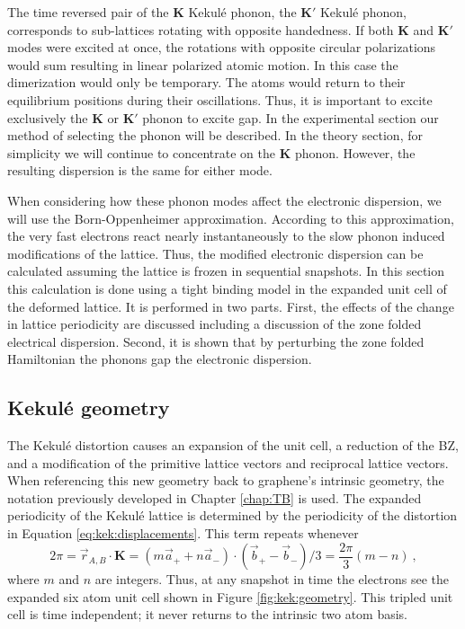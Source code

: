 The time reversed pair of the $\bm{K}$ Kekul\'e phonon, the $\bm{K'}$ Kekul\'e phonon, corresponds to sub-lattices rotating with opposite handedness.
If both $\bm{K}$ and $\bm{K'}$ modes were excited at once, the rotations with opposite circular polarizations would sum resulting in linear polarized atomic motion.
In this case the dimerization would only be temporary.
The atoms would return to their equilibrium positions during their oscillations.
Thus, it is important to excite exclusively the $\bm{K}$ or $\bm{K'}$ phonon to excite gap.
In the experimental section our method of selecting the phonon will be described.
In the theory section, for simplicity we will continue to concentrate on the $\bm{K}$ phonon.
However, the resulting dispersion is the same for either mode. 

When considering how these phonon modes affect the electronic dispersion, we will use the Born-Oppenheimer approximation.
According to this approximation, the very fast electrons react nearly instantaneously to the slow phonon induced modifications of the lattice.
Thus, the modified electronic dispersion can be calculated assuming the lattice is frozen in sequential snapshots.
In this section this calculation is done using a tight binding model in the expanded unit cell of the deformed lattice.
It is performed in two parts.
First, the effects of the change in lattice periodicity are discussed including a discussion of the zone folded electrical dispersion.
Second, it is shown that by perturbing the zone folded Hamiltonian the phonons gap the electronic dispersion.

\subsection{Kekul\'e geometry}
The Kekul\'e distortion causes an expansion of the unit cell, a reduction of the BZ, and a modification of the primitive lattice vectors and reciprocal lattice vectors.
When referencing this new geometry back to graphene's intrinsic geometry, the notation previously developed in Chapter \ref{chap:TB} is used.
The expanded periodicity of the Kekul\'e lattice is determined by the periodicity of the distortion in Equation \ref{eq:kek:displacements}.
This term repeats whenever 
\begin{equation*}
	2 \pi=\vec{r}_{A,B} \cdot \bm{K}=(m \vec{a}_+ + n \vec{a}_-) \cdot (\vec{b}_+ - \vec{b}_-)/3=\frac{2 \pi}{3} (m-n) \ ,
\end{equation*}
where $m$ and $n$ are integers.
Thus, at any snapshot in time the electrons see the expanded six atom unit cell shown in Figure \ref{fig:kek:geometry}.
This tripled unit cell is time independent; it never returns to the intrinsic two atom basis. 

